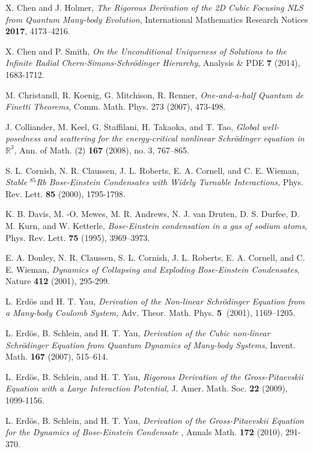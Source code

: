 \documentclass[12pt,letterpaper,leqno]{amsart}
\theoremstyle{plain}
\numberwithin{equation}{section}
\numberwithin{theorem}{section}
\numberwithin{proposition}{section}
\numberwithin{lemma}{section}
\numberwithin{corollary}{section}
\begin{document}
\begin{thebibliography}{99}
 X. Chen and J. Holmer, \emph{The Rigorous
Derivation of the 2D Cubic Focusing NLS from Quantum Many-body Evolution},
International Mathematics Research Notices \textbf{2017}, 4173--4216.

 X. Chen and P. Smith, \emph{On the Unconditional
Uniqueness of Solutions to the Infinite Radial Chern-Simons-Schr\"{o}dinger
Hierarchy}, Analysis \& PDE \textbf{7} (2014), 1683-1712.

 M. Christandl, R. Koenig, G. Mitchison, R.
Renner, \emph{One-and-a-half Quantum de Finetti Theorems}, Comm. Math. Phys.
273 (2007), 473-498.

 J. Colliander, M. Keel, G. Staffilani, H. Takaoka, and T.
Tao, \emph{Global well-posedness and scattering for the energy-critical
nonlinear Schr\"{o}dinger equation in $\mathbb{R}^{3}$}, Ann. of Math. (2) 
\textbf{167} (2008), no. 3, 767--865.

 S. L. Cornish, N. R. Claussen, J. L. Roberts, E. A.
Cornell, and C. E. Wieman, \emph{Stable }$^{85}$\emph{Rb Bose-Einstein
Condensates with Widely Turnable Interactions, }Phys. Rev. Lett. \textbf{85 }
(2000), 1795-1798.

 K. B. Davis, M. -O. Mewes, M. R. Andrews, N. J. van Druten,
D. S. Durfee, D. M. Kurn, and W. Ketterle, \emph{Bose-Einstein condensation
in a gas of sodium atoms}, Phys. Rev. Lett. \textbf{75 }(1995), 3969--3973.

 E. A. Donley, N. R. Claussen, S. L. Cornish, J. L. Roberts,
E. A. Cornell, and C. E. Wieman, \emph{Dynamics of Collapsing and Exploding
Bose-Einstein Condensates}, Nature \textbf{412} (2001), 295-299.

 L. Erd\"{o}s and H. T. Yau, \emph{Derivation of the
Non-linear Schr\"{o}dinger Equation from a Many-body Coulomb System,} Adv.
Theor. Math. Phys. \textbf{5\ }(2001), 1169--1205.

 L. Erd\"{o}s, B. Schlein, and H. T. Yau, \emph{Derivation
of the Cubic non-linear Schr\"{o}dinger Equation from Quantum Dynamics of
Many-body Systems}, Invent. Math. \textbf{167} (2007), 515--614.

 L. Erd\"{o}s, B. Schlein, and H. T. Yau, \emph{Rigorous
Derivation of the Gross-Pitaevskii Equation with a Large Interaction
Potential}, J. Amer. Math. Soc. \textbf{22} (2009), 1099-1156.

 L. Erd\"{o}s, B. Schlein, and H. T. Yau, \emph{Derivation
of the Gross-Pitaevskii Equation for the Dynamics of Bose-Einstein Condensate%
}, Annals Math. \textbf{172} (2010), 291-370.{}


\end{thebibliography}
\end{document}
